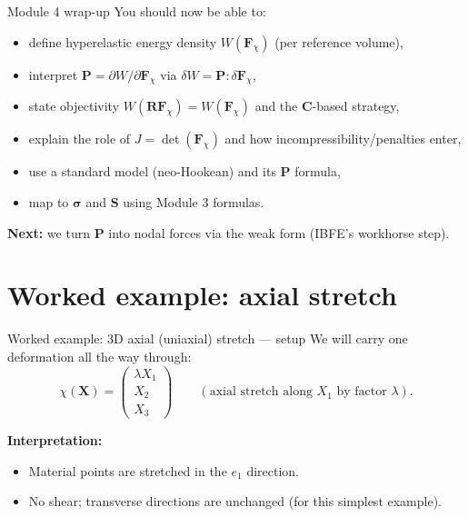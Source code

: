 \documentclass[aspectratio=169]{beamer}
\newcommand{\X}{\bm{X}}
\newcommand{\Cten}{\bm{C}}     %
\newcommand{\sigmaC}{\bm{\sigma}} %
\newcommand{\Sten}{\bm{S}}     %
\newcommand{\Fdef}{\bm{F}_{\chi}}  %
\newcommand{\Pten}{\bm{P}}         %
\begin{document}
\begin{frame}{Module 4 wrap-up}
\small
You should now be able to:
\begin{itemize}
\item define hyperelastic energy density \(W(\Fdef)\) (per reference volume),
\item interpret \(\Pten=\partial W/\partial \Fdef\) via \(\delta W=\Pten:\delta\Fdef\),
\item state objectivity \(W(\bm{R}\Fdef)=W(\Fdef)\) and the \(\Cten\)-based strategy,
\item explain the role of \(J=\det(\Fdef)\) and how incompressibility/penalties enter,
\item use a standard model (neo-Hookean) and its \(\Pten\) formula,
\item map to \(\sigmaC\) and \(\Sten\) using Module 3 formulas.
\end{itemize}

\medskip
\textbf{Next:} we turn \(\Pten\) into nodal forces via the weak form (IBFE’s workhorse step).
\end{frame}




\section{Worked example: axial stretch}

\begin{frame}{Worked example: 3D axial (uniaxial) stretch --- setup}
\small
We will carry one deformation all the way through:
\[
\chi(\X) = 
\begin{pmatrix}
\lambda X_1\\
X_2\\
X_3
\end{pmatrix}
\qquad (\text{axial stretch along }X_1\text{ by factor }\lambda).
\]

\medskip
\textbf{Interpretation:}
\begin{itemize}
\item Material points are stretched in the \(e_1\) direction.
\item No shear; transverse directions are unchanged (for this simplest example).
\end{itemize}

\end{frame}
\end{document}
